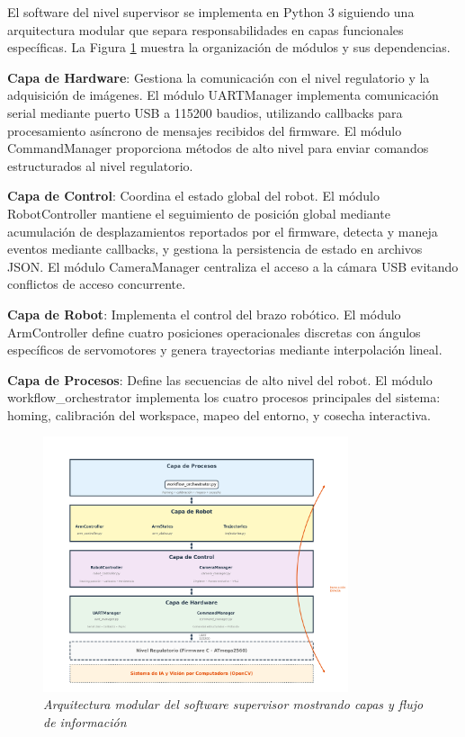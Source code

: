 El software del nivel supervisor se implementa en Python 3 siguiendo una arquitectura modular que separa responsabilidades en capas funcionales específicas. La Figura \ref{fig:arquitectura_modulos_supervisor} muestra la organización de módulos y sus dependencias.

\textbf{Capa de Hardware}: Gestiona la comunicación con el nivel regulatorio y la adquisición de imágenes. El módulo UARTManager implementa comunicación serial mediante puerto USB a 115200 baudios, utilizando callbacks para procesamiento asíncrono de mensajes recibidos del firmware. El módulo CommandManager proporciona métodos de alto nivel para enviar comandos estructurados al nivel regulatorio.

\textbf{Capa de Control}: Coordina el estado global del robot. El módulo RobotController mantiene el seguimiento de posición global mediante acumulación de desplazamientos reportados por el firmware, detecta y maneja eventos mediante callbacks, y gestiona la persistencia de estado en archivos JSON. El módulo CameraManager centraliza el acceso a la cámara USB evitando conflictos de acceso concurrente.

\textbf{Capa de Robot}: Implementa el control del brazo robótico. El módulo ArmController define cuatro posiciones operacionales discretas con ángulos específicos de servomotores y genera trayectorias mediante interpolación lineal.

\textbf{Capa de Procesos}: Define las secuencias de alto nivel del robot. El módulo workflow\_orchestrator implementa los cuatro procesos principales del sistema: homing, calibración del workspace, mapeo del entorno, y cosecha interactiva.

\begin{figure}[H]
    \centering
    \includegraphics[width=0.8\textwidth]{imagenes/arquitectura_modulos_supervisor.png}
    \caption{\textit{Arquitectura modular del software supervisor mostrando capas y flujo de información}}
    \label{fig:arquitectura_modulos_supervisor}
\end{figure}